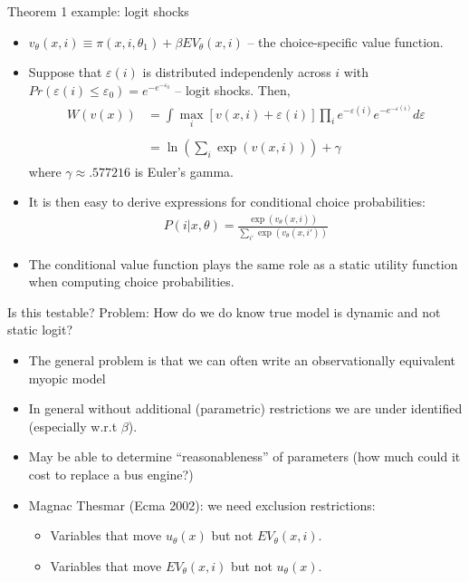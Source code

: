 \documentclass[xcolor=pdftex,dvipsnames,table,mathserif,aspectratio=169]{beamer}
\begin{document}
\begin{frame}{Theorem 1 example: logit shocks}
\footnotesize
\begin{itemize}
	\item $v_{\theta}\left(x,i\right) \equiv \pi \left(x,i,\theta_{1}\right)+\beta EV_{\theta}\left(x,i\right)$ -- the \alert{choice-specific value function}.

	\smallskip
	\item Suppose that $\varepsilon\left(i\right)$ is distributed independenly
	across $i$ with $Pr\left(\varepsilon\left(i\right)\le\varepsilon_{0}\right)=e^{-e^{-\varepsilon_{0}}}$ -- logit shocks.
	Then,
	\begin{align*}
	\begin{array}{ccl}
	W\left(v\left(x\right)\right) & =  
	\int\max_{i}\left[v\left(x,i\right)+\varepsilon\left(i\right)\right]
	\prod_{i}e^{-\varepsilon\left(i\right)}e^{-e^{-\varepsilon\left(i\right)}}d\varepsilon\\
	\\
	 & =  \ln\left(\sum_{i}\exp\left(v\left(x,i\right)\right)\right)+\gamma
	\end{array}
	\end{align*}
	where $\gamma\approx .577216$ is Euler's gamma.

	\smallskip
	\item It is then easy to derive expressions for conditional choice probabilities:
	\begin{align*}
	P\left(i|x,\theta\right)= \frac{\exp\left(v_{\theta}\left(x,i\right)\right)}{\sum_{i'}\exp\left(v_{\theta}\left(x,i'\right)\right)}
	\end{align*}
	\smallskip
	\item The conditional value function plays the same role as a static utility function
	when computing choice probabilities.
\end{itemize}
\end{frame}


\begin{frame}{Is this testable?}
Problem: How do we do know true model is dynamic and not static logit?
\begin{itemize}
\item The general problem is that we can often write an observationally equivalent \alert{myopic model}
\item In general without additional (parametric) restrictions we are under identified (especially w.r.t $\beta$).
\item May be able to determine ``reasonableness'' of parameters (how much could it cost to replace a bus engine?)
\item Magnac Thesmar (Ecma 2002): we need \alert{exclusion restrictions}:
\begin{itemize}
\item Variables that move $u_{\theta}(x)$ but not $EV_{\theta}(x,i)$.
\item Variables that move $EV_{\theta}(x,i)$ but not $u_{\theta}(x)$.
\end{itemize}
\end{itemize}
\end{frame}
\end{document}
